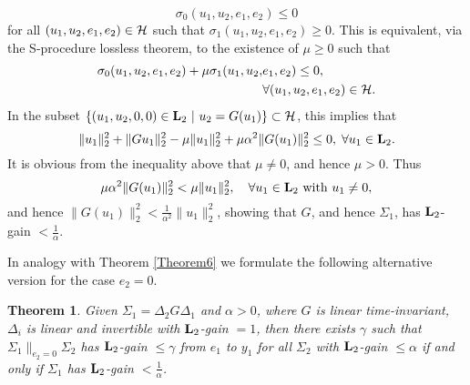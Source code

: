 \documentclass[11pt]{article}
\newtheorem{thm}[lemma]{Theorem}
\newcommand{\Ltwo}{\boldsymbol{\rm L}_{2}}
\begin{document}
\[
 \sigma_0(u_1, u_2, e_1, e_2) \leq 0
 \]
for all  $(u_1, u_2, e_1, e_2) \in \mathcal{H}$ such that $\sigma_1(u_1, u_2, e_1, e_2) \geq 0$.
This is equivalent, via the S-procedure lossless theorem, to the existence of $\mu \geq 0$ such that
\begin{align*}
 \sigma_0(u_1, u_2, e_1, e_2) + \mu \sigma_1(u_1, u_2, & e_1, e_2) \leq 0, \\
 & \forall (u_1, u_2, e_1, e_2) \in \mathcal{H}.
\end{align*}
In the subset $\{(u_1, u_2, 0, 0) \in \Ltwo\ |\ u_2 = G (u_1)\} \subset \HH$, this implies that
\[
\|u_1\|_2^2 + \|Gu_1\|_2^2 - \mu \|u_1\|_2^2 + \mu \alpha^2 \|G (u_1)\|_2^2 \leq 0, \; \forall u_1 \in \Ltwo.
\]
It is obvious from the inequality above that $\mu \neq 0$, and hence $\mu >0$. Thus
\[
 \mu \alpha^2 \|G (u_1)\|_2^2 < \mu \|u_1\|_2^2, \quad \forall u_1 \in \Ltwo \mbox{ with } u_1 \neq 0,
\]
and hence $\|G (u_1)\|_2^2 < \frac{1}{\alpha^2} \|u_1\|_2^2$, showing that $G$, and hence $\Sigma_1$, has $\Ltwo$-gain $ < \frac{1}{\alpha}$.

\medskip

In analogy with Theorem \ref{Theorem6} we formulate the following alternative version for the case $e_2=0$.

\begin{thm}
  Given $\Sigma_1 = \Delta_2 G \Delta_1$ and $\alpha >0$, where $G$ is linear time-invariant, $\Delta_i$ is linear and invertible with $\Ltwo$-gain
  $= 1$, then there exists $\gamma$ such that $\Sigma_1 \|_{e_2=0} \Sigma_2$ has $\Ltwo$-gain $\leq \gamma$ from $e_1$ to $y_1$ for all $\Sigma_2$
  with $\Ltwo$-gain $\leq \alpha$ if and only if $\Sigma_1$ has $\Ltwo$-gain $< \frac{1}{\alpha}$.
\end{thm}
\end{document}
